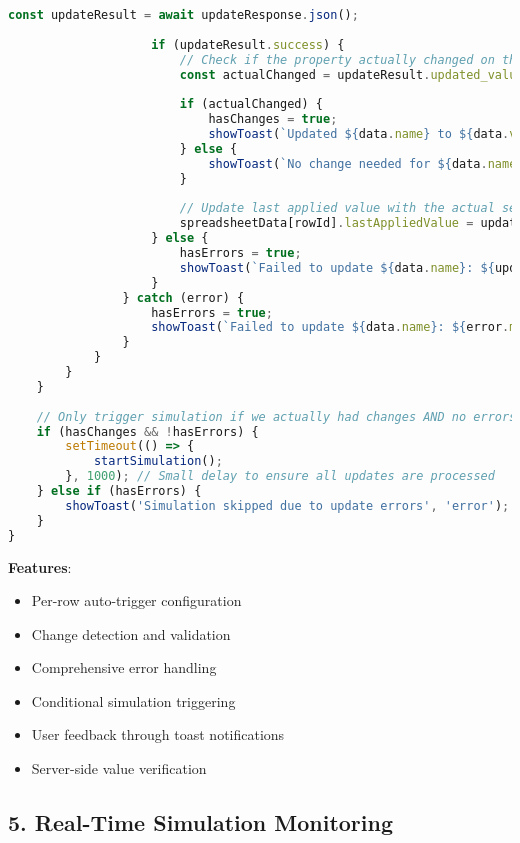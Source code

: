 \documentclass[12pt,a4paper]{article}
\begin{document}
\begin{lstlisting}[language=JavaScript, caption=Auto-Trigger Implementation]
                    const updateResult = await updateResponse.json();
                    
                    if (updateResult.success) {
                        // Check if the property actually changed on the server
                        const actualChanged = updateResult.updated_value !== data.lastAppliedValue;
                        
                        if (actualChanged) {
                            hasChanges = true;
                            showToast(`Updated ${data.name} to ${data.value}`, 'success');
                        } else {
                            showToast(`No change needed for ${data.name}`, 'info');
                        }
                        
                        // Update last applied value with the actual server value
                        spreadsheetData[rowId].lastAppliedValue = updateResult.updated_value;
                    } else {
                        hasErrors = true;
                        showToast(`Failed to update ${data.name}: ${updateResult.error}`, 'error');
                    }
                } catch (error) {
                    hasErrors = true;
                    showToast(`Failed to update ${data.name}: ${error.message}`, 'error');
                }
            }
        }
    }
    
    // Only trigger simulation if we actually had changes AND no errors occurred
    if (hasChanges && !hasErrors) {
        setTimeout(() => {
            startSimulation();
        }, 1000); // Small delay to ensure all updates are processed
    } else if (hasErrors) {
        showToast('Simulation skipped due to update errors', 'error');
    }
}
\end{lstlisting}

\textbf{Features}:
\begin{itemize}
    \item Per-row auto-trigger configuration
    \item Change detection and validation
    \item Comprehensive error handling
    \item Conditional simulation triggering
    \item User feedback through toast notifications
    \item Server-side value verification
\end{itemize}

\subsection{5. Real-Time Simulation Monitoring}
\end{document}
